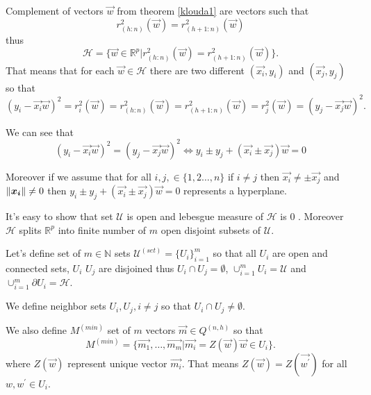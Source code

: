\begin{corollary}
	Complement of vectors $\vec{w}$ from theorem \ref{klouda1} are vectors such that 
	\begin{equation}
		r^{2}_{(h:n)}(\vec{w}) = r^{2}_{(h+1:n)}(\vec{w})
	\end{equation}
	thus
	\begin{equation}
		\mathcal{H} = \{{ \vec{w} \in \mathbb{R}^{p} | r^{2}_{(h:n)}(\vec{w}) = r^{2}_{(h+1:n)}(\vec{w}) \}}.
	\end{equation}
	That means that for each $\vec{w} \in \mathcal{H}$ there are two different $(\vec{x_i}, y_i)$ and  $(\vec{x_j}, y_j)$ so that
	\begin{equation}
		(y_i - \vec{x_i} \vec{w})^2 = r^{2}_i(\vec{w}) =  r^{2}_{(h:n)}(\vec{w}) = r^{2}_{(h+1:n)}(\vec{w}) =  r^{2}_j(\vec{w}) = (y_j - \vec{x_j} \vec{w})^2.
	\end{equation}

	We can see that 
	\begin{equation}
		(y_i - \vec{x_i} \vec{w})^2 =  (y_j - \vec{x_j} \vec{w})^2 \iff	  y_i \pm y_j + (\vec{x_i} \pm \vec{x_j})  \vec{w} = 0
	\end{equation}
\end{corollary}

Moreover if we assume that for all $i,j, \in \{{1,2 \ldots, n \}}$  if $ i \neq j$ then $\vec{x_i} \neq \pm \vec{x_j}$ and $\left\lVert\boldsymbol{x_i}\right\rVert \neq 0$ then $ y_i \pm y_j + (\vec{x_i} \pm \vec{x_j})  \vec{w} = 0$ represents a hyperplane. 

It's easy to show that set $\mathcal{U}$ is open and 	lebesgue measure of $\mathcal{H}$  is $0$ \cite{klouda2015exact}. Moreover $\mathcal{H}$ splits $\mathbb{R}^{p}$ into finite number of $m$ open disjoint subsets of $\mathcal{U}$. 

\begin{definition}
	Let's define set of $m \in \mathbb{N}$ sets $\mathcal{U}^{(set)} = \{{ U_i\}}_{i=1}^{m}$ so that
	all $U_i$ are open and connected sets, $U_i$ $U_j$ are disjoined thus $U_i \cap  U_j = \emptyset$, $\cup_{i=1}^{m}	U_i = \mathcal{U}$ and $\cup_{i=1}^{m}	\partial U_i =  \mathcal{H}$.

	We define neighbor sets $U_i, U_j, i \neq j$ so that $ U_i \cap U_j \neq \emptyset$. 

	We also define $M^{(min)}$ set of $m$ vectors $\vec{m} \in Q^{(n,h)}$ so that 
	\begin{equation*}
		M^{(min)} = \{{ \vec{m_1}, \ldots, \vec{m_m} | \vec{m_i} = Z(\vec{w}) \vec{w} \in U_i  \}}.
	\end{equation*}
	where $Z(\vec{w})$ represent unique vector $\vec{m_i}$. That means $Z(\vec{w}) = Z(\vec{w^{\prime}})$ for all $w, w^{\prime} \in U_i$.
\end{definition}

